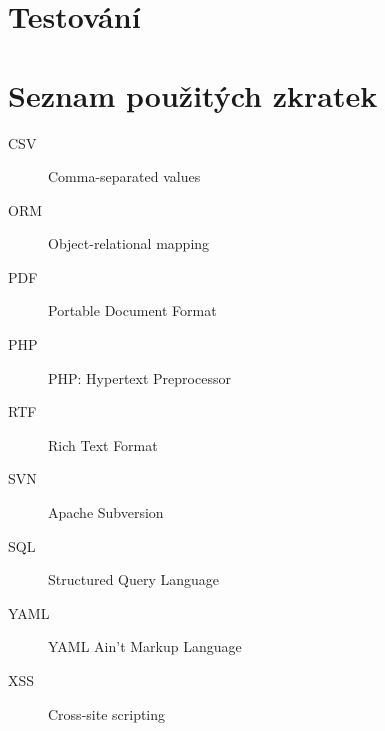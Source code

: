 \documentclass[thesis=B,czech]{FITthesis}[2011/06/14]
\begin{document}
\chapter{Testování}





\begin{conclusion}
\end{conclusion}




\appendix

\chapter{Seznam použitých zkratek}
\begin{description}
	\item[CSV] Comma-separated values
	\item[ORM] Object-relational mapping
	\item[PDF] Portable Document Format	
	\item[PHP] PHP: Hypertext Preprocessor
	\item[RTF] Rich Text Format
	\item[SVN] Apache Subversion
	\item[SQL] Structured Query Language
	\item[YAML] YAML Ain't Markup Language 
	\item[XSS] Cross-site scripting
	\item[]
	\item[]
	\item[]	
\end{description}


% 
% 
% 
\end{document}
